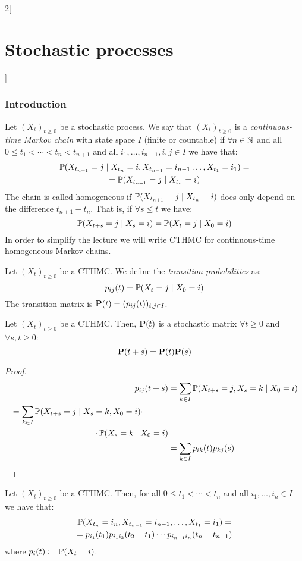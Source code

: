 \documentclass[../../../main_math.tex]{subfiles}
\begin{document}
\begin{multicols}{2}[\section{Stochastic processes}]
  \subsubsection{Introduction}
  \begin{definition}
    Let ${(X_t)}_{t\geq 0}$ be a stochastic process. We say that ${(X_t)}_{t\geq 0}$ is a \emph{continuous-time Markov chain} with state space $I$ (finite or countable) if $\forall n\in\mathbb{N}$ and all $0\leq t_1<\cdots<t_n<t_{n+1}$ and all $i_1,\ldots,i_{n-1},i,j\in I$ we have that:
    \begin{multline*}
      \mathbb{P}(X_{t_{n+1}}=j\mid X_{t_n}=i, X_{t_{n-1}}=i_{n-1}\ldots,X_{t_1}=i_1)=\\=\mathbb{P}(X_{t_{n+1}}=j\mid X_{t_n}=i)
    \end{multline*}
    The chain is called homogeneous if $\mathbb{P}(X_{t_{n+1}}=j\mid X_{t_n}=i)$ does only depend on the difference $t_{n+1}-t_n$. That is, if $\forall s\leq t$ we have:
    $$
      \mathbb{P}(X_{t+s}=j\mid X_{s}=i)=\mathbb{P}(X_{t}=j\mid X_0=i)
    $$
    In order to simplify the lecture we will write CTHMC for continuous-time homogeneous Markov chains.
  \end{definition}
  \begin{definition}
    Let ${(X_t)}_{t\geq 0}$ be a CTHMC. We define the \emph{transition probabilities} as:
    $$
      p_{ij}(t)=\mathbb{P}(X_t=j\mid X_0=i)
    $$
    The transition matrix is $\boldsymbol{\mathrm{P}}(t)=(p_{ij}(t))_{i,j\in I}$.
  \end{definition}
  \begin{proposition}\label{SP:ChapKolmo_continuous}
    Let ${(X_t)}_{t\geq 0}$ be a CTHMC. Then, $\boldsymbol{\mathrm{P}}(t)$ is a stochastic matrix $\forall t\geq 0$ and $\forall s,t \geq 0$: $$\boldsymbol{\mathrm{P}}(t+s)=\boldsymbol{\mathrm{P}}(t)\boldsymbol{\mathrm{P}}(s)$$
  \end{proposition}
  \begin{proof}
    \begin{align*}
      p_{ij}(t+s) & =\sum_{k\in I} \Prob(X_{t+s}=j,X_s=k\mid X_0=i) \\
      \begin{split}
        & =\sum_{k\in I} \Prob(X_{t+s}=j\mid X_s=k,X_0=i)\cdot\\
        &\hspace{3.5cm}\cdot\Prob(X_s=k\mid X_0=i) \\
      \end{split}         \\
                  & =\sum_{k\in I} p_{ik}(t)p_{kj}(s)
    \end{align*}
  \end{proof}
  \begin{proposition}
    Let ${(X_t)}_{t\geq 0}$ be a CTHMC. Then, for all $0\leq t_1 < \cdots < t_n$ and all $i_1,\ldots,i_{n}\in I$ we have that:
    \begin{multline*}
      \mathbb{P}(X_{t_n}=i_n,X_{t_{n-1}}=i_{n-1},\ldots,X_{t_1}=i_1)=\\
      =p_{i_1}(t_1)p_{i_1i_2}(t_2-t_1)\cdots p_{i_{n-1}i_n}(t_n-t_{n-1})
    \end{multline*}
    where $p_{i}(t):= \mathbb{P}(X_t=i)$.
  \end{proposition}

\end{multicols}
\end{document}
